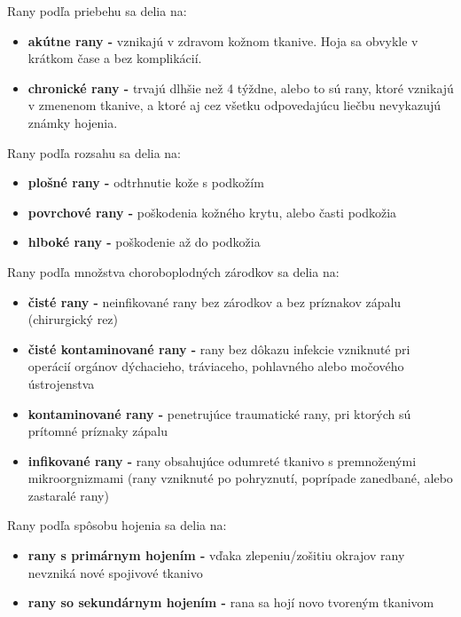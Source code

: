 Rany podľa priebehu sa delia na:
\begin{itemize} 
\item \textbf{akútne rany -} vznikajú v zdravom kožnom tkanive. Hoja sa obvykle v krátkom čase a bez komplikácií.
\item \textbf{chronické rany -} trvajú dlhšie než 4 týždne, alebo to sú rany, ktoré vznikajú v zmenenom tkanive, a ktoré aj cez všetku odpovedajúcu liečbu nevykazujú známky hojenia.
\end{itemize}
Rany podľa rozsahu sa delia na:
\begin{itemize} 
\item \textbf{plošné rany -} odtrhnutie kože s podkožím
\item \textbf{povrchové rany -} poškodenia kožného krytu, alebo časti podkožia
\item \textbf{hlboké rany -} poškodenie až do podkožia
\end{itemize}
Rany podľa množstva choroboplodných zárodkov sa delia na:
\begin{itemize} 
\item \textbf{čisté rany -} neinfikované rany bez zárodkov a bez príznakov zápalu (chirurgický rez)
\item \textbf{čisté kontaminované rany -} rany bez dôkazu infekcie vzniknuté pri operácií orgánov dýchacieho, tráviaceho, pohlavného alebo močového ústrojenstva
\item \textbf{kontaminované rany -} penetrujúce traumatické rany, pri ktorých sú prítomné príznaky zápalu 
\item \textbf{infikované rany -} rany obsahujúce odumreté tkanivo s premnoženými mikroorgnizmami (rany vzniknuté po pohryznutí, poprípade zanedbané, alebo zastaralé rany)
\end{itemize}
Rany podľa spôsobu hojenia sa delia na:
\begin{itemize} 
\item \textbf{rany s primárnym hojením -} vďaka zlepeniu/zošitiu okrajov rany nevzniká nové spojivové tkanivo
\item \textbf{rany so sekundárnym hojením -} rana sa hojí novo tvoreným tkanivom
\end{itemize}

